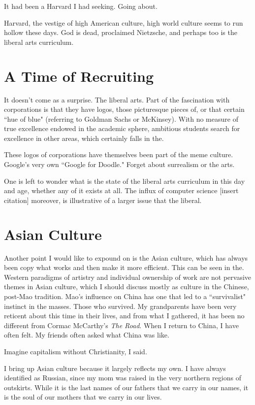 \documentclass[12pt,letterpaper]{article}
\begin{document}
It had been a Harvard I had seeking.  Going about.

Harvard, the vestige of high American culture, high world culture seems to run hollow these days.  God is dead, proclaimed Nietzsche, and perhaps too is the liberal arts curriculum.

\section{A Time of Recruiting}
It doesn't come as a surprise.  The liberal arts.  Part of the fascination with corporations is that they have logos, those picturesque pieces of, or that certain ``hue of blue" (referring to Goldman Sachs or McKinsey).  With no measure of true excellence endowed in the academic sphere, ambitious students search for excellence in other areas, which certainly falls in the.  

These logos of corporations have themselves been part of the meme culture.  Google's very own ``Google for Doodle."  Forget about surrealism or the arts.

One is left to wonder what is the state of the liberal arts curriculum in this day and age, whether any of it exists at all.  The influx of computer science [insert citation] moreover, is illustrative of a larger issue that the liberal.

\section{Asian Culture}
Another point I would like to expound on is the Asian culture, which has always been copy what works and then make it more efficient.  This can be seen in the.  Western paradigms of artistry and individual ownership of work are not pervasive themes in Asian culture, which I should discuss mostly as culture in the Chinese, post-Mao tradition.  Mao's influence on China has one that led to a ``survivalist" instinct in the masses.  Those who survived.  My grandparents have been very reticent about this time in their lives, and from what I gathered, it has been no different from Cormac McCarthy's \textit{The Road}.  When I return to China, I have often felt.  My friends often asked what China was like.  

Imagine capitalism without Christianity, I said.

I bring up Asian culture because it largely reflects my own.  I have always identified as Russian, since my mom was raised in the very northern regions of outskirts.  While it is the last names of our fathers that we carry in our names, it is the soul of our mothers that we carry in our lives.
\end{document}
